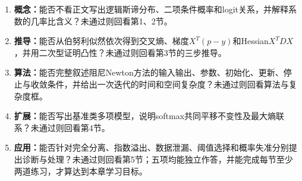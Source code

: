 \begin{SLCompactClosure}
\label{struct:V2-C05-CH36}

\label{struct:V2-C05-CH37}
\begin{selfcheckbox}
\begin{enumerate}[leftmargin=2.2em]
  \item \textbf{概念：}能否不看正文写出逻辑斯谛分布、二项条件概率和logit关系，并解释系数的几率比含义？未通过则回看第1、2节。
  \item \textbf{推导：}能否从伯努利似然依次得到交叉熵、梯度$X^T(p-y)$和Hessian$X^TDX$，并用二次型证明凸性？未通过则回看第3节的三步推导。
  \item \textbf{算法：}能否完整叙述阻尼Newton方法的输入输出、参数、初始化、更新、停止与收敛条件，并给出一次迭代的时间和空间复杂度？未通过则回看算法与复杂度框。
  \item \textbf{扩展：}能否写出基准类多项模型，说明\mbox{softmax}共同平移不变性及最大熵联系？未通过则回看第4节。
  \item \textbf{应用：}能否针对完全分离、指数溢出、数据泄漏、阈值选择和概率失准分别提出诊断与处理？未通过则回看第5节；五项均能独立作答，并能完成每节至少两道练习，才算达到本章学习目标。
\end{enumerate}
\end{selfcheckbox}
\end{SLCompactClosure}
